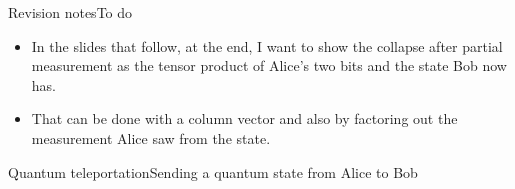 \begin{frame}{Revision notes}{To do}

\begin{itemize}
    \item In the slides that follow, at the end, I want to show the collapse after partial measurement as the tensor product of Alice's two bits and the state Bob now has.
    \item That can be done with a column vector and also by factoring out the measurement Alice saw from the state.
\end{itemize}
    
\end{frame}
\begin{frame}{Quantum teleportation}{Sending a quantum state from Alice to Bob}

\end{frame}
